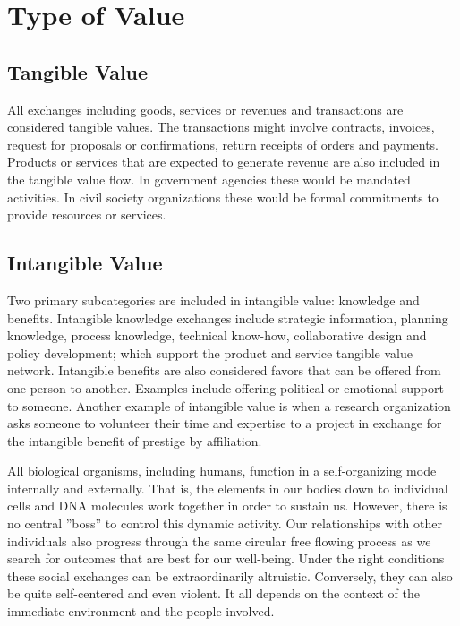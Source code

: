
\section{Type of Value}
\subsection{Tangible Value}

All exchanges including goods, services or revenues and transactions are considered tangible values. The transactions might involve contracts, invoices, request for proposals or confirmations, return receipts of orders and payments. Products or services that are expected to generate revenue are also included in the tangible value flow. In government agencies these would be mandated activities. In civil society organizations these would be formal commitments to provide resources or services.

\subsection{Intangible Value}

Two primary subcategories are included in intangible value: knowledge and benefits. Intangible knowledge exchanges include strategic information, planning knowledge, process knowledge, technical know-how, collaborative design and policy development; which support the product and service tangible value network. Intangible benefits are also considered favors that can be offered from one person to another. Examples include offering political or emotional support to someone. Another example of intangible value is when a research organization asks someone to volunteer their time and expertise to a project in exchange for the intangible benefit of prestige by affiliation.

All biological organisms, including humans, function in a self-organizing mode internally and externally. That is, the elements in our bodies down to individual cells and DNA molecules work together in order to sustain us. However, there is no central ”boss” to control this dynamic activity. Our relationships with other individuals also progress through the same circular free flowing process as we search for outcomes that are best for our well-being. Under the right conditions these social exchanges can be extraordinarily altruistic. Conversely, they can also be quite self-centered and even violent. It all depends on the context of the immediate environment and the people involved.


